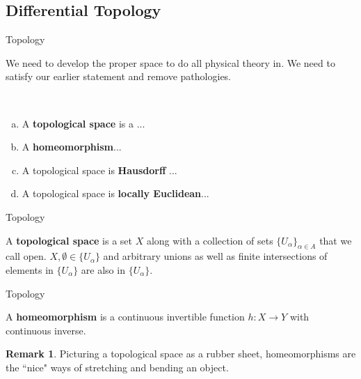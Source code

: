 \documentclass[usenames,dvipsnames]{beamer}
\theoremstyle{definition}
\newtheorem*{remark}{Remark}
\theoremstyle{theorem}
\begin{document}
    \subsection{Differential Topology}
        \begin{frame}{Topology}
            \begin{paragraph}
                We need to develop the proper space to do all physical theory in.  We need to satisfy our earlier statement and remove pathologies.
            \end{paragraph}
            \begin{definitions}~
                \begin{enumerate}[(a)]
                    \item A \textbf{topological space} is a ...
                    \item A \textbf{homeomorphism}...
                    \item A topological space is \textbf{Hausdorff} ...
                    \item A topological space is \textbf{locally Euclidean}...
                \end{enumerate}
            \end{definitions}
        \end{frame}
        
        \begin{frame}{Topology}
            \begin{definition}
                A \textbf{topological space} is a set $X$ along with a collection of sets $\{U_\alpha\}_{\alpha \in A}$ that we call open. $X,\emptyset \in \{U_\alpha\}$ and arbitrary unions as well as finite intersections of elements in $\{U_\alpha\}$ are also in $\{U_\alpha\}$.
            \end{definition}
        \end{frame}
        
        \begin{frame}{Topology}
            \begin{definition}
                A \textbf{homeomorphism} is a continuous invertible function $h\colon X \to Y$ with continuous inverse. 
            \end{definition}
            \begin{remark}
                Picturing a topological space as a rubber sheet, homeomorphisms are the ``nice" ways of stretching and bending an object.
            \end{remark}
        \end{frame}
        
\end{document}
